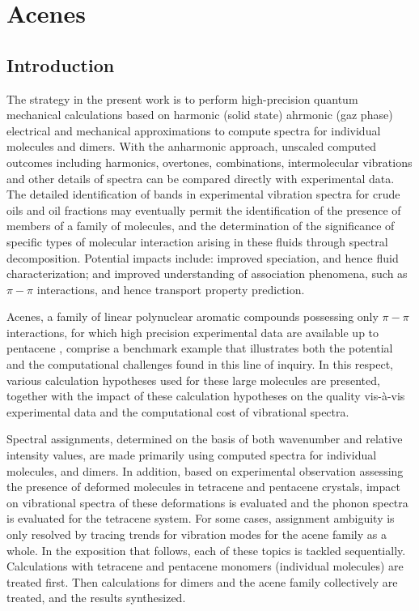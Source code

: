 \chapter[Phonon calculation]{Acenes}
\minitoc
\restoregeometry

\newpage

\section*{Introduction}

The strategy in the present work is to perform high-precision quantum mechanical calculations based on harmonic (solid state) ahrmonic (gaz phase) electrical and mechanical approximations to compute spectra for individual molecules and dimers. With the anharmonic approach, unscaled computed outcomes including harmonics, overtones, combinations, intermolecular vibrations and other details of spectra can be compared directly with experimental data. The detailed identification of bands in experimental vibration spectra for crude oils and oil fractions may eventually permit the identification of the presence of members of a family of molecules, and the determination of the significance of specific types of molecular interaction arising in these fluids through spectral decomposition. Potential impacts include: improved speciation, and hence fluid characterization; and improved understanding of association phenomena, such as $\pi-\pi$ interactions, and hence transport property prediction. 

Acenes, a family of linear polynuclear aromatic compounds possessing only $\pi-\pi$ interactions, for which high precision experimental data are available up to pentacene \cite{michaelian2012far}, comprise a benchmark example that illustrates both the potential and the computational challenges found in this line of inquiry. In this respect, various calculation hypotheses used for these large molecules are presented, together with the impact of these calculation hypotheses on the quality vis-à-vis experimental data and the computational cost of vibrational spectra. 

Spectral assignments, determined on the basis of both wavenumber and relative intensity values, are made primarily using computed spectra for individual molecules, and dimers. In addition, based on experimental observation assessing the presence of deformed molecules in tetracene and pentacene crystals, impact on vibrational spectra of these deformations is evaluated and the phonon spectra is evaluated for the tetracene system. For some cases, assignment ambiguity is only resolved by tracing trends for vibration modes for the acene family as a whole. In the exposition that follows, each of these topics is tackled sequentially. Calculations with tetracene and pentacene monomers (individual molecules) are treated first. Then calculations for dimers and the acene family collectively are treated, and the results synthesized.

